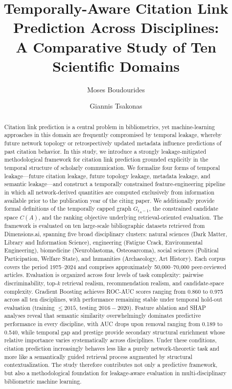 \documentclass[11pt,a4paper]{article}
\title{Temporally-Aware Citation Link Prediction Across Disciplines:\\
A Comparative Study of Ten Scientific Domains}
\author[1]{Moses Boudourides}
\author[2]{Giannis Tsakonas}
\affil[1]{School of Professional Studies, Northwestern University, Evanston, IL, USA%
\authorcr\texttt{Moses.Boudourides@northwestern.edu}}
\affil[2]{Library \& Information Center, University of Patras, Greece%
\authorcr\texttt{gtsak@upatras.gr}}
\date{}
\begin{document}
\sloppy

\maketitle

\begin{abstract}
Citation link prediction is a central problem in bibliometrics, yet machine-learning approaches in this domain are frequently compromised by temporal leakage, whereby future network topology or retrospectively updated metadata influence predictions of past citation behavior. In this study, we introduce a strongly leakage-mitigated methodological framework for citation link prediction grounded explicitly in the temporal structure of scholarly communication. We formalize four forms of temporal leakage---future citation leakage, future topology leakage, metadata leakage, and semantic leakage---and construct a temporally constrained feature-engineering pipeline in which all network-derived quantities are computed exclusively from information available prior to the publication year of the citing paper. We additionally provide formal definitions of the temporally capped graph \(G_{t_A-1}\), the constrained candidate space \(C(A)\), and the ranking objective underlying retrieval-oriented evaluation. The framework is evaluated on ten large-scale bibliographic datasets retrieved from Dimensions.ai, spanning five broad disciplinary clusters: natural sciences (Dark Matter, Library and Information Science), engineering (Fatigue Crack, Environmental Engineering), biomedicine (Neuroblastoma, Osteosarcoma), social sciences (Political Participation, Welfare State), and humanities (Archaeology, Art History). Each corpus covers the period 1975--2024 and comprises approximately 50,000--70,000 peer-reviewed articles. Evaluation is organized across four levels of task complexity: pairwise discriminability, top-\(k\) retrieval realism, recommendation realism, and candidate-space complexity. Gradient Boosting achieves ROC-AUC scores ranging from 0.860 to 0.975 across all ten disciplines, with performance remaining stable under temporal hold-out evaluation (training $\le 2015$, testing $2016-2020$). Feature ablation and SHAP analyses reveal that semantic similarity overwhelmingly dominates predictive performance in every discipline, with AUC drops upon removal ranging from 0.189 to 0.540, while temporal gap and prestige provide secondary structural enrichment whose relative importance varies systematically across disciplines. Under these conditions, citation prediction increasingly behaves less like a purely network-theoretic task and more like a semantically guided retrieval process augmented by structural contextualization. The study therefore contributes not only a predictive framework, but also a methodological foundation for leakage-aware evaluation in multi-disciplinary bibliometric machine learning.
\end{abstract}
\end{document}
